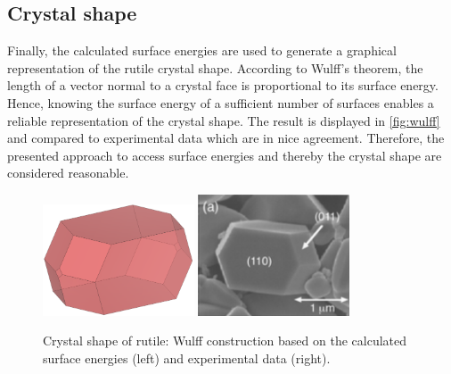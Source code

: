 \documentclass[a4paper,12pt]{scrartcl}
\begin{document}
\subsection{Crystal shape}
%
Finally, the calculated surface energies are used to generate a graphical representation of the rutile crystal shape. According to Wulff's theorem, the length
of a vector normal to a crystal face is proportional to its surface energy. Hence, knowing the surface energy of a sufficient number of surfaces enables a reliable representation of the crystal shape. The result is displayed in \autoref{fig:wulff} and compared to experimental data which are in nice agreement. Therefore, the presented approach to access surface energies and thereby the crystal shape are considered reasonable.
%
\begin{figure}[H]
	\centering
	\includegraphics[width=0.4\textwidth]{wulff_construction_tio2.png}
	\includegraphics[width=0.4\textwidth]{rutile_exp.png}
	\caption{Crystal shape of rutile: Wulff construction based on the calculated surface energies (left) and experimental data\autocite[]{rutile-shape} (right).}
	\label{fig:wulff}
\end{figure}
%
\newpage
\printbibliography[title={Literature}]
%
\end{document}
